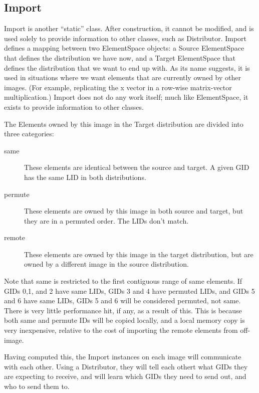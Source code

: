 \documentclass[10pt,relax]{TpetraDesign}
\begin{document}

%
\subsection{Import}

Import is another ``static'' class. After construction, it cannot be modified, and is used solely to provide information to other classes, such as Distributor. Import defines a mapping between two ElementSpace objects: a Source ElementSpace that defines the distribution we have now, and a Target ElementSpace that defines the distribution that we want to end up with. As its name suggests, it is used in situations where we want elements that are currently owned by other images. (For example, replicating the x vector in a row-wise matrix-vector multiplication.) Import does not do any work itself; much like ElementSpace, it exists to provide information to other classes. 

The Elements owned by this image in the Target distribution are divided into three categories:
\begin{description}
\item[same] These elements are identical between the source and target. A given GID has the same LID in both distributions. 

\item[permute] These elements are owned by this image in both source and target, but they are in a permuted order. The LIDs don't match.

\item[remote] These elements are owned by this image in the target distribution, but are owned by a different image in the source distribution.
\end{description}

Note that same is restricted to the first contiguous range of same elements. If GIDs 0,1, and 2 have same LIDs, GIDs 3 and 4 have permuted LIDs, and GIDs 5 and 6 have same LIDs, GIDs 5 and 6 will be considered permuted, not same. There is very little performance hit, if any, as a result of this. This is because both same and permute IDs will be copied locally, and a local memory copy is very inexpensive, relative to the cost of importing the remote elements from off-image.

Having computed this, the Import instances on each image will communicate with each other. Using a Distributor, they will tell each othert what GIDs they are expecting to receive, and will learn which GIDs they need to send out, and who to send them to.
\end{document}
